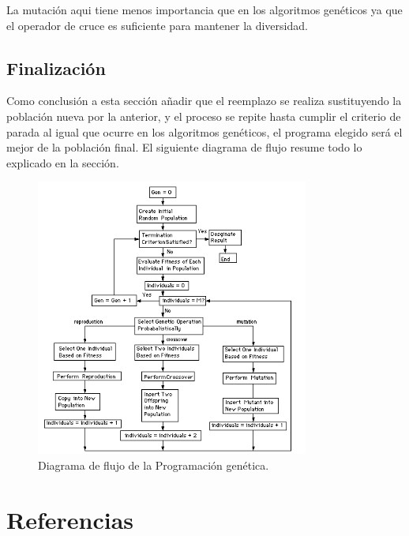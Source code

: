 \documentclass[12pt]{article} \usepackage[utf8x]{inputenc}
\begin{document}
La mutación aqui tiene menos importancia que en los algoritmos genéticos ya que el operador de cruce es suficiente para mantener la diversidad.

\subsection{Finalización}

Como conclusión a esta sección añadir que el reemplazo se realiza sustituyendo la población nueva por la anterior, y el proceso se repite hasta cumplir el criterio de parada al igual que ocurre en los algoritmos genéticos, el programa elegido será el mejor de la población final. El siguiente diagrama de flujo resume todo lo explicado en la sección.
  
\begin{figure}[H]
    \centering
    \includegraphics[width=0.8\textwidth]{FlowchartGP.PNG}
    \caption{Diagrama de flujo de la Programación genética.}
    \label{fig:dfd:1}
\end{figure}


\section{Referencias}
\end{document}
